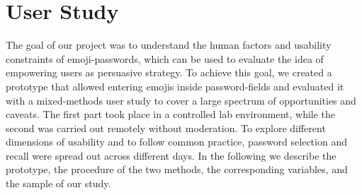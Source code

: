 

\section{User Study}
The goal of our project was to understand the human factors and usability constraints of emoji-passwords, which can be used to evaluate the idea of empowering users as persuasive strategy. To achieve this goal, we created a prototype that allowed entering emojis inside password-fields and evaluated it with a mixed-methods user study to cover a large spectrum of opportunities and caveats. The first part took place in a controlled lab environment, while the second was carried out remotely without moderation. To explore different dimensions of usability and to follow common practice, password selection and recall were spread out across different days. In the following we describe the prototype, the procedure of the two methods, the corresponding variables, and the sample of our study. 

